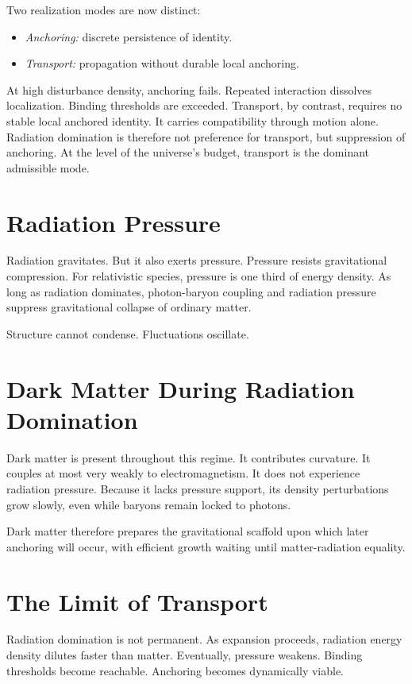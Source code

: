 \documentclass[11pt,twoside,openright]{book}
\begin{document}
Two realization modes are now distinct:

\begin{itemize}
\item \emph{Anchoring:} discrete persistence of identity.
\item \emph{Transport:} propagation without durable local anchoring.
\end{itemize}

At high disturbance density, anchoring fails. Repeated interaction dissolves localization. Binding thresholds are exceeded. Transport, by contrast, requires no stable local anchored identity. It carries compatibility through motion alone. Radiation domination is therefore not preference for transport, but suppression of anchoring. At the level of the universe's budget, transport is the dominant admissible mode.

\section*{Radiation Pressure}

Radiation gravitates. But it also exerts pressure. Pressure resists gravitational compression. For relativistic species, pressure is one third of energy density. As long as radiation dominates, photon-baryon coupling and radiation pressure suppress gravitational collapse of ordinary matter.

Structure cannot condense. Fluctuations oscillate.

\section*{Dark Matter During Radiation Domination}

Dark matter is present throughout this regime. It contributes curvature. It couples at most very weakly to electromagnetism. It does not experience radiation pressure. Because it lacks pressure support, its density perturbations grow slowly, even while baryons remain locked to photons.

Dark matter therefore prepares the gravitational scaffold upon which later anchoring will occur, with efficient growth waiting until matter-radiation equality.

\section*{The Limit of Transport}

Radiation domination is not permanent. As expansion proceeds, radiation energy density dilutes faster than matter. Eventually, pressure weakens. Binding thresholds become reachable. Anchoring becomes dynamically viable.
\end{document}
